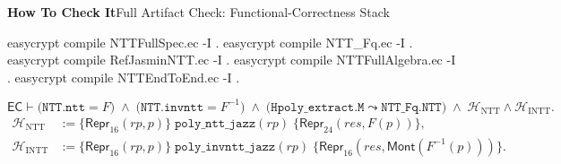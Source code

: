 \documentclass[10pt,aspectratio=1610,compress,dvipsnames]{beamer}
\newcommand{\ec}[1]{\texttt{#1}}
\begin{document}
\begin{frame}[fragile]{\bfseries How To Check It}{Full Artifact Check: Functional-Correctness Stack}
\begin{ecblock}
easycrypt compile NTTFullSpec.ec -I .
easycrypt compile NTT_Fq.ec -I .
easycrypt compile RefJasminNTT.ec -I .
easycrypt compile NTTFullAlgebra.ec -I .
easycrypt compile NTTEndToEnd.ec -I .
\end{ecblock}

\vspace{4pt}
\begin{center}
\scriptsize
\[
  \mathsf{EC}\vdash
  \bigl(\ec{NTT.ntt}=F\bigr)
  \;\land\; \bigl(\ec{NTT.invntt}=F^{-1}\bigr)
  \;\land\; \bigl(\ec{Hpoly\_extract.M}\leadsto\ec{NTT\_Fq.NTT}\bigr)
  \;\land\; \mathcal H_{\mathrm{NTT}}\land\mathcal H_{\mathrm{INTT}}.
\]
\[
\begin{aligned}
\mathcal H_{\mathrm{NTT}} &:=
\{\mathsf{Repr}_{16}(rp,p)\}\;\ec{poly\_ntt\_jazz}(rp)\;
\{\mathsf{Repr}_{24}(res,F(p))\},\\
\mathcal H_{\mathrm{INTT}} &:=
\{\mathsf{Repr}_{16}(rp,p)\}\;\ec{poly\_invntt\_jazz}(rp)\;
\{\mathsf{Repr}_{16}(res,\mathsf{Mont}(F^{-1}(p)))\}.
\end{aligned}
\]
\end{center}
\end{frame}
\end{document}
